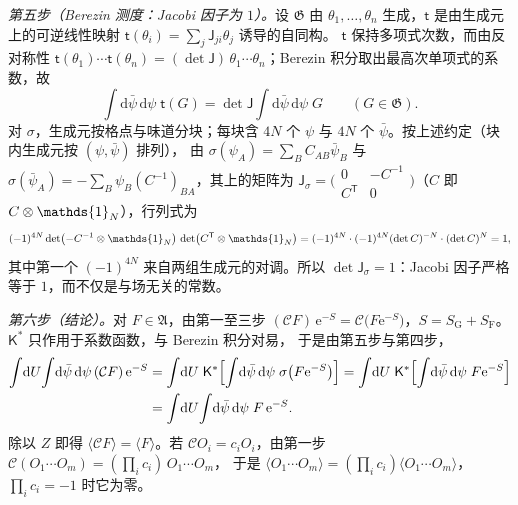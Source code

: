 \documentclass[UTF8,a4paper,11pt,fontset=fandol]{ctexart}
\makeatletter
\let\amsmathbb\mathbb
\renewcommand{\mathbb}[1]{\ifx1#1\mathds{1}\else\amsmathbb{#1}\fi}
\theoremstyle{cplain}
\theoremstyle{cdefinition}
\theoremstyle{cremark}
\renewcommand{\proofname}{证明}
\renewenvironment{proof}[1][\proofname]{\par\pushQED{\qed}\normalfont\topsep6\p@\@plus6\p@\relax
  \trivlist\item[\hskip\labelsep\itshape #1\hspace{0.5em}]\ignorespaces}{\popQED\endtrivlist\@endpefalse}
\numberwithin{equation}{section}
\newcommand{\dd}{\mathrm{d}}                         %
\newcommand{\tp}{\mathsf{T}}                         %
\newcommand{\Cop}{\mathcal{C}}                       %
\newcommand{\ee}{\mathrm{e}}                        %
\makeatother
\begin{document}
\begin{proof}
\emph{第五步（Berezin 测度：Jacobi 因子为 $1$）。}设 $\mathfrak G$ 由 $\theta_1,\dots,\theta_n$ 生成，$\mathsf t$ 是由生成元上的可逆线性映射 $\mathsf t(\theta_i)=\sum_j\mathsf J_{ji}\theta_j$ 诱导的自同构。
$\mathsf t$ 保持多项式次数，而由反对称性 $\mathsf t(\theta_1)\cdots\mathsf t(\theta_n)=(\det\mathsf J)\,\theta_1\cdots\theta_n$；Berezin 积分取出最高次单项式的系数，故
\begin{equation}\label{eq:np-berezin}
\int\dd\bar\psi\,\dd\psi\;\mathsf t(G)=\det\mathsf J\int\dd\bar\psi\,\dd\psi\;G\qquad(G\in\mathfrak G).
\end{equation}
对 $\sigma$，生成元按格点与味道分块；每块含 $4N$ 个 $\psi$ 与 $4N$ 个 $\bar\psi$。按上述约定（块内生成元按 $(\psi,\bar\psi)$ 排列），
由 $\sigma(\psi_A)=\sum_BC_{AB}\bar\psi_B$ 与 $\sigma(\bar\psi_A)=-\sum_B\psi_B(C^{-1})_{BA}$，其上的矩阵为 $\mathsf J_\sigma=\bigl(\begin{smallmatrix}0&-C^{-1}\\C^{\tp}&0\end{smallmatrix}\bigr)$（$C$ 即 $C\otimes\mathbb 1_N$），行列式为
\begin{equation*}
(-1)^{4N}\det\bigl(-C^{-1}\otimes\mathbb 1_N\bigr)\,\det\bigl(C^{\tp}\otimes\mathbb 1_N\bigr)=(-1)^{4N}\cdot(-1)^{4N}(\det C)^{-N}\cdot(\det C)^{N}=1 ,
\end{equation*}
其中第一个 $(-1)^{4N}$ 来自两组生成元的对调。所以 $\det\mathsf J_\sigma=1$：Jacobi 因子严格等于 $1$，而不仅是与场无关的常数。

\emph{第六步（结论）。}对 $F\in\mathfrak A$，由第一至三步 $(\Cop F)\,\ee^{-S}=\Cop\bigl(F\ee^{-S}\bigr)$，$S=S_{\mathrm G}+S_{\mathrm F}$。$\mathsf K^*$ 只作用于系数函数，与 Berezin 积分对易，
于是由第五步与第四步，
\begin{equation}\label{eq:np-final}
\begin{aligned}
\int\!\dd U\!\int\!\dd\bar\psi\,\dd\psi\,(\Cop F)\,\ee^{-S}
&=\int\!\dd U\;\mathsf K^*\Bigl[\int\!\dd\bar\psi\,\dd\psi\;\sigma\bigl(F\ee^{-S}\bigr)\Bigr]
=\int\!\dd U\;\mathsf K^*\Bigl[\int\!\dd\bar\psi\,\dd\psi\;F\ee^{-S}\Bigr]\\
&=\int\!\dd U\!\int\!\dd\bar\psi\,\dd\psi\;F\,\ee^{-S}.
\end{aligned}
\end{equation}
除以 $Z$ 即得 $\langle\Cop F\rangle=\langle F\rangle$。若 $\Cop O_i=c_iO_i$，由第一步 $\Cop(O_1\cdots O_m)=(\prod_ic_i)\,O_1\cdots O_m$，
于是 $\langle O_1\cdots O_m\rangle=(\prod_ic_i)\langle O_1\cdots O_m\rangle$，$\prod_ic_i=-1$ 时它为零。
\end{proof}
\end{document}
